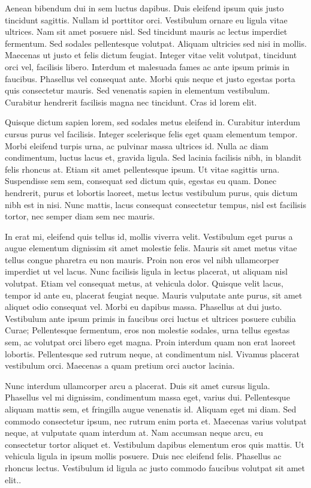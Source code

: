 
Aenean bibendum dui in sem luctus dapibus. Duis eleifend ipsum quis justo tincidunt sagittis. Nullam id porttitor orci. Vestibulum ornare eu ligula vitae ultrices. Nam sit amet posuere nisl. Sed tincidunt mauris ac lectus imperdiet fermentum. Sed sodales pellentesque volutpat. Aliquam ultricies sed nisi in mollis. Maecenas ut justo et felis dictum feugiat. Integer vitae velit volutpat, tincidunt orci vel, facilisis libero. Interdum et malesuada fames ac ante ipsum primis in faucibus. Phasellus vel consequat ante. Morbi quis neque et justo egestas porta quis consectetur mauris. Sed venenatis sapien in elementum vestibulum. Curabitur hendrerit facilisis magna nec tincidunt. Cras id lorem elit.


Quisque dictum sapien lorem, sed sodales metus eleifend in. Curabitur interdum cursus purus vel facilisis. Integer scelerisque felis eget quam elementum tempor. Morbi eleifend turpis urna, ac pulvinar massa ultrices id. Nulla ac diam condimentum, luctus lacus et, gravida ligula. Sed lacinia facilisis nibh, in blandit felis rhoncus at. Etiam sit amet pellentesque ipsum. Ut vitae sagittis urna. Suspendisse sem sem, consequat sed dictum quis, egestas eu quam. Donec hendrerit, purus et lobortis laoreet, metus lectus vestibulum purus, quis dictum nibh est in nisi. Nunc mattis, lacus consequat consectetur tempus, nisl est facilisis tortor, nec semper diam sem nec mauris.


In erat mi, eleifend quis tellus id, mollis viverra velit. Vestibulum eget purus a augue elementum dignissim sit amet molestie felis. Mauris sit amet metus vitae tellus congue pharetra eu non mauris. Proin non eros vel nibh ullamcorper imperdiet ut vel lacus. Nunc facilisis ligula in lectus placerat, ut aliquam nisl volutpat. Etiam vel consequat metus, at vehicula dolor. Quisque velit lacus, tempor id ante eu, placerat feugiat neque. Mauris vulputate ante purus, sit amet aliquet odio consequat vel. Morbi eu dapibus massa. Phasellus at dui justo. Vestibulum ante ipsum primis in faucibus orci luctus et ultrices posuere cubilia Curae; Pellentesque fermentum, eros non molestie sodales, urna tellus egestas sem, ac volutpat orci libero eget magna. Proin interdum quam non erat laoreet lobortis. Pellentesque sed rutrum neque, at condimentum nisl. Vivamus placerat vestibulum orci. Maecenas a quam pretium orci auctor lacinia.


Nunc interdum ullamcorper arcu a placerat. Duis sit amet cursus ligula. Phasellus vel mi dignissim, condimentum massa eget, varius dui. Pellentesque aliquam mattis sem, et fringilla augue venenatis id. Aliquam eget mi diam. Sed commodo consectetur ipsum, nec rutrum enim porta et. Maecenas varius volutpat neque, at vulputate quam interdum at. Nam accumsan neque arcu, eu consectetur tortor aliquet et. Vestibulum dapibus elementum eros quis mattis. Ut vehicula ligula in ipsum mollis posuere. Duis nec eleifend felis. Phasellus ac rhoncus lectus. Vestibulum id ligula ac justo commodo faucibus volutpat sit amet elit..

\endgroup			

\vfill